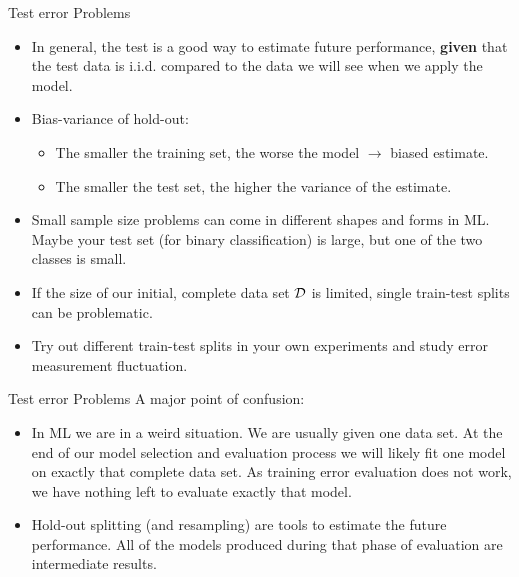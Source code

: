 \documentclass[11pt,compress,t,notes=noshow, xcolor=table]{beamer}
\begin{document}
\begin{vbframe}{Test error Problems}
\begin{itemize}
    \item In general, the test is a good way to estimate future performance, \textbf{given} that the test data is
    i.i.d. compared to the data we will see when we apply the model.
  \item Bias-variance of hold-out:\\
  \begin{itemize}
    \item The smaller the training set, the worse the model $\rightarrow$ biased estimate.\\
    \item The smaller the test set, the higher the variance of the estimate.
  \end{itemize}   
   \item Small sample size problems can come in different shapes and forms in ML. Maybe your test set (for binary classification) is large,
    but one of the two classes is small.
  \item If the size of our initial, complete data set $\mathcal{D}$ is limited,
  single train-test splits can be problematic.
  \item Try out different train-test splits in your own experiments and study error measurement fluctuation.
\end{itemize}
\end{vbframe}













\begin{vbframe}{Test error Problems}
A major point of confusion:
\begin{itemize}
\item In ML we are in a weird situation. We are usually given one data set. At the end of our model selection and evaluation process
we will likely fit one model on exactly that complete data set. As training error evaluation does not work,
we have nothing left to evaluate exactly that model.
\item Hold-out splitting (and resampling) are tools to estimate the future
performance. All of the models produced during that phase of evaluation are intermediate results.
\end{itemize}
\end{vbframe}
\end{document}
